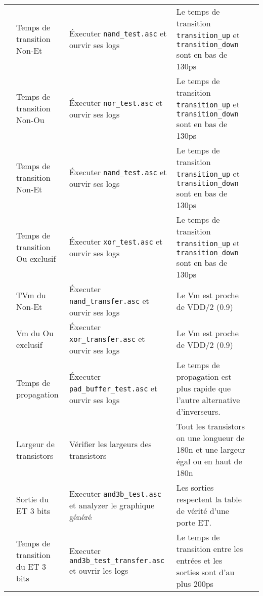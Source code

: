 \documentclass[a11paper]{article}
\newcommand{\cbox}{\fbox{\phantom{\ding{51}}}}
\newcounter{tid}
\newcommand{\tid}{\stepcounter{tid}\thetid}
\begin{document}
\begin{center}
\begin{longtable}{lp{4cm}p{4cm}p{5cm}l}
	  \tid &
    Temps de transition Non-Et &
		Éxecuter \verb|nand_test.asc| et ourvir ses logs &
		Le temps de transition \verb|transition_up| et \verb|transition_down| sont
    en bas de 130ps &
		\cbox \\

		\tid &
    Temps de transition Non-Ou &
		Éxecuter \verb|nor_test.asc| et ourvir ses logs &
		Le temps de transition \verb|transition_up| et \verb|transition_down| sont
    en bas de 130ps &
		\cbox \\

	  \tid &
    Temps de transition Non-Et &
		Éxecuter \verb|nand_test.asc| et ourvir ses logs &
		Le temps de transition \verb|transition_up| et \verb|transition_down| sont
    en bas de 130ps &
		\cbox \\

	  \tid &
    Temps de transition Ou exclusif &
		Éxecuter \verb|xor_test.asc| et ourvir ses logs &
		Le temps de transition \verb|transition_up| et \verb|transition_down| sont
    en bas de 130ps & \\

	  \tid &
    TVm du Non-Et &
		Éxecuter \verb|nand_transfer.asc| et ourvir ses logs &
		Le Vm est proche de VDD/2 (0.9) &
		\cbox \\

	  \tid &
    Vm du Ou exclusif &
		Éxecuter \verb|xor_transfer.asc| et ourvir ses logs &
		Le Vm est proche de VDD/2 (0.9) &
		\cbox \\


    \tid &
    Temps de propagation &
		Éxecuter \verb|pad_buffer_test.asc| et ourvir ses logs &
		Le temps de propagation est plus rapide que l'autre alternative
    d'inverseurs. &
		\cbox \\


    \tid &
    Largeur de transistors &
		Vérifier les largeurs des transistors &
		Tout les transistors on une longueur de 180n et une largeur égal ou en haut
    de 180n &
		\cbox \\


    \tid &
    Sortie du ET 3 bits &
		Executer \verb|and3b_test.asc| et analyzer le graphique généré &
		Les sorties respectent la table de vérité d'une porte ET. &
		\cbox \\

    \tid &
    Temps de transition du ET 3 bits &
		Executer \verb|and3b_test_transfer.asc| et ouvrir les logs &
		Le temps de transition entre les entrées et les sorties sont d'au plus
    200ps &
		\cbox \\


\end{longtable}
\end{center}
\end{document}
